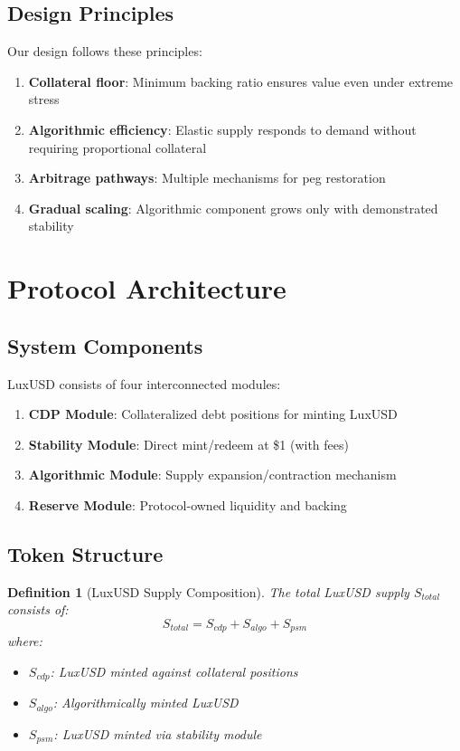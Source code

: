 \documentclass[11pt,a4paper]{article}
\newtheorem{definition}[theorem]{Definition}
\begin{document}
\subsection{Design Principles}

Our design follows these principles:
\begin{enumerate}
    \item \textbf{Collateral floor}: Minimum backing ratio ensures value even under extreme stress
    \item \textbf{Algorithmic efficiency}: Elastic supply responds to demand without requiring proportional collateral
    \item \textbf{Arbitrage pathways}: Multiple mechanisms for peg restoration
    \item \textbf{Gradual scaling}: Algorithmic component grows only with demonstrated stability
\end{enumerate}

\section{Protocol Architecture}

\subsection{System Components}

LuxUSD consists of four interconnected modules:

\begin{enumerate}
    \item \textbf{CDP Module}: Collateralized debt positions for minting LuxUSD
    \item \textbf{Stability Module}: Direct mint/redeem at \$1 (with fees)
    \item \textbf{Algorithmic Module}: Supply expansion/contraction mechanism
    \item \textbf{Reserve Module}: Protocol-owned liquidity and backing
\end{enumerate}

\subsection{Token Structure}

\begin{definition}[LuxUSD Supply Composition]
The total LuxUSD supply $S_{total}$ consists of:
\begin{equation}
    S_{total} = S_{cdp} + S_{algo} + S_{psm}
\end{equation}
where:
\begin{itemize}
    \item $S_{cdp}$: LuxUSD minted against collateral positions
    \item $S_{algo}$: Algorithmically minted LuxUSD
    \item $S_{psm}$: LuxUSD minted via stability module
\end{itemize}
\end{definition}
\end{document}
